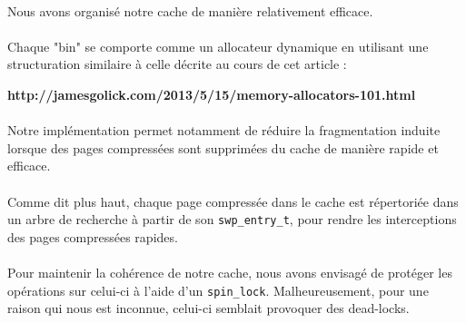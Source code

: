\documentclass[a4paper]{article}
\begin{document}
    \paragraph{}Nous avons organisé notre cache de manière relativement efficace.

    \paragraph{}Chaque "bin" se comporte comme un allocateur dynamique en
utilisant une structuration similaire à celle décrite au cours de cet article :

    \begin{center}
        \textbf{http://jamesgolick.com/2013/5/15/memory-allocators-101.html}
    \end{center}

    \paragraph{}Notre implémentation permet notamment de réduire la
fragmentation induite lorsque des pages compressées sont supprimées du cache de
manière rapide et efficace.

    \paragraph{}Comme dit plus haut, chaque page compressée dans le cache est
répertoriée dans un arbre de recherche à partir de son \texttt{swp\_entry\_t},
pour rendre les interceptions des pages compressées rapides.

    \paragraph{}Pour maintenir la cohérence de notre cache, nous avons envisagé
de protéger les opérations sur celui-ci à l'aide d'un \texttt{spin\_lock}.
Malheureusement, pour une raison qui nous est inconnue, celui-ci semblait
provoquer des dead-locks.
\end{document}
